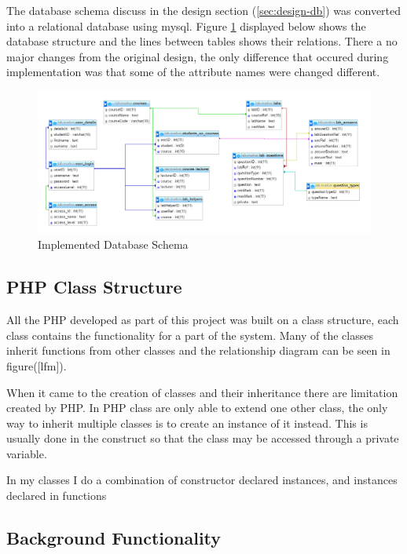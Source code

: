 \documentclass[12pt]{article}  %
\begin{document}
The database schema discuss in the design section (\ref{sec:design-db}) was converted into a relational database using mysql. Figure \ref{fig:implement-db} displayed below shows the database structure and the lines between tables shows their relations. There a no major changes from the original design, the only difference that occured during implementation was that some of the attribute names were changed different.  

\begin{figure}[H]
    \centering
    \includegraphics[width=1\textwidth]{images/implementation/database.png}
    \caption{Implemented Database Schema}
    \label{fig:implement-db}
\end{figure}

\subsection{PHP Class Structure}

All the PHP developed as part of this project was built on a class structure, each class contains the functionality for a part of the system. Many of the classes inherit functions from other classes and the relationship diagram can be seen in figure([lfm]). 

When it came to the creation of classes and their inheritance there are limitation created by PHP. In PHP class are only able to extend one other class, the only way to inherit multiple classes is to create an instance of it instead. This is usually done in the construct so that the class may be accessed through a private variable. 


In my classes I do a combination of constructor declared instances, and instances declared in functions






\subsection{Background Functionality}
\end{document}
